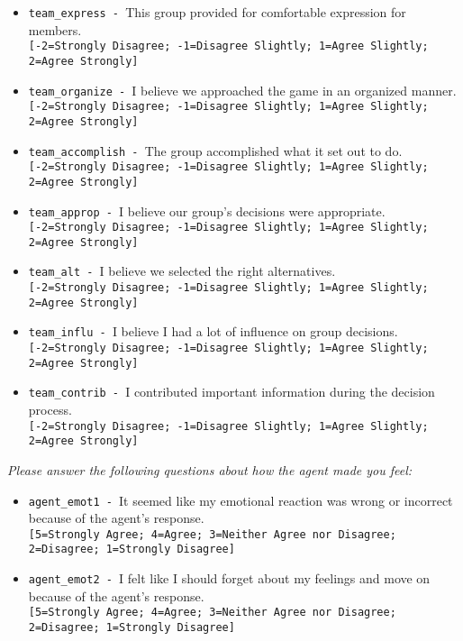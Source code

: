 \begin{description}
\begin{addmargin}[0em]{0em}
\begin{addmargin}[1em]{0em}
\begin{itemize}
            \item \verb|team_express - |This group provided for comfortable expression for members.\\\verb|[-2=Strongly Disagree; -1=Disagree Slightly; 1=Agree Slightly; 2=Agree Strongly]|
            \item \verb|team_organize - |I believe we approached the game in an organized manner.\\\verb|[-2=Strongly Disagree; -1=Disagree Slightly; 1=Agree Slightly; 2=Agree Strongly]|
            \item \verb|team_accomplish - |The group accomplished what it set out to do.\\\verb|[-2=Strongly Disagree; -1=Disagree Slightly; 1=Agree Slightly; 2=Agree Strongly]|
            \item \verb|team_approp - |I believe our group's decisions were appropriate.\\\verb|[-2=Strongly Disagree; -1=Disagree Slightly; 1=Agree Slightly; 2=Agree Strongly]|
            \item \verb|team_alt - |I believe we selected the right alternatives.\\\verb|[-2=Strongly Disagree; -1=Disagree Slightly; 1=Agree Slightly; 2=Agree Strongly]|
            \item \verb|team_influ - |I believe I had a lot of influence on group decisions.\\\verb|[-2=Strongly Disagree; -1=Disagree Slightly; 1=Agree Slightly; 2=Agree Strongly]|
            \item \verb|team_contrib - |I contributed important information during the decision process.\\\verb|[-2=Strongly Disagree; -1=Disagree Slightly; 1=Agree Slightly; 2=Agree Strongly]|
        \end{itemize}
        \begin{addmargin}[1em]{0em}
            \textit{Please answer the following questions about how the agent made you feel:}
        \end{addmargin}
        \begin{itemize}
            \item \verb|agent_emot1 - |It seemed like my emotional reaction was wrong or incorrect because of the agent's response.\\\verb|[5=Strongly Agree; 4=Agree; 3=Neither Agree nor Disagree; 2=Disagree; 1=Strongly Disagree]|
            \item \verb|agent_emot2 - |I felt like I should forget about my feelings and move on because of the agent's response.\\\verb|[5=Strongly Agree; 4=Agree; 3=Neither Agree nor Disagree; 2=Disagree; 1=Strongly Disagree]|

\end{itemize}
\end{addmargin}
\end{addmargin}
\end{description}

